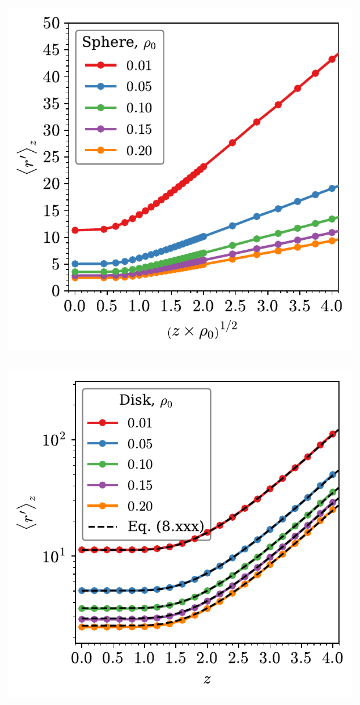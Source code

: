 \begin{figure}

	\begin{subfigure}[b]{0.48\textwidth}
         \centering
         \includegraphics[width=\textwidth]{./figures/quasi2d/d_z_3d_sphere.pdf}
         \caption{}
         \label{fig:nphia}
     \end{subfigure}
     \hfill
     \begin{subfigure}[b]{0.48\textwidth}
         \centering
         \includegraphics[width=\textwidth]{./figures/quasi2d/d_z_3d_disk.pdf}
         \caption{}
         \label{fig:nphib}
     \end{subfigure}
     \hfill
     

\end{figure}
